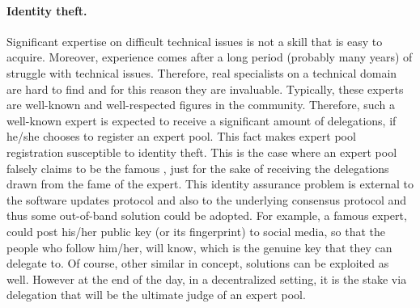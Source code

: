 \paragraph{Identity theft.}
Significant expertise on difficult technical issues is not a skill that is easy
to acquire. Moreover, experience comes after a long period (probably many years)
of struggle with technical issues. Therefore, real specialists on a technical
domain are hard to find and for this reason they are invaluable. Typically,
these experts are well-known and well-respected figures in the community.
Therefore, such a well-known expert is expected to receive a significant amount
of delegations, if he/she chooses to register an expert pool. This fact makes
expert pool registration susceptible to identity theft. This is the case where
an expert pool falsely claims to be the famous , just for the sake
of receiving the delegations drawn from the fame of the expert. This identity
assurance problem is external to the software updates protocol and also to the
underlying consensus protocol and thus some out-of-band solution could be
adopted. For example, a famous expert, could post his/her public key (or its
fingerprint) to social media, so that the people who follow him/her, will know,
which is the genuine key that they can delegate to. Of course, other similar in
concept, solutions can be exploited as well. However at the end of the day, in a
decentralized setting, it is the stake via delegation that will be the ultimate
judge of an expert pool.


